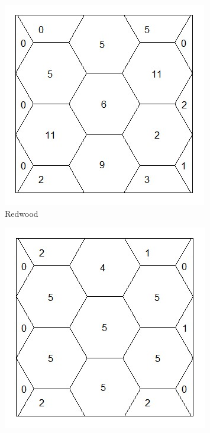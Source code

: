 \documentclass[12pt]{article}
\makeatletter
\theoremstyle{homework}
\newenvironment{exercise}[1]
{\def\@currentlabel{#1}\exercisecore}
{\endexercisecore}
\makeatother
\begin{document}
\begin{exercise}{4}
    \begin{figure}[H]
      \centering
      \caption{Hexagonal Partitions}
      \begin{subfigure}[b]{0.45\textwidth}
          \centering
          \includegraphics[width=\textwidth]{redwood.jpg}
          \caption{Redwood}
      \end{subfigure}
      \hfill
      \begin{subfigure}[b]{0.45\textwidth}
          \centering
          \includegraphics[width=\textwidth]{cells.jpg}

\end{subfigure}
\end{figure}
\end{exercise}
\end{document}
